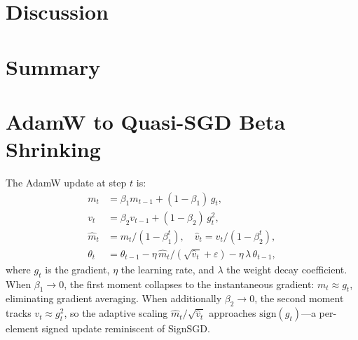\documentclass[10pt,conference,compsocconf]{IEEEtran}
\begin{document}


\section{Discussion}



\section{Summary}



\newpage




\appendix

\section{AdamW to Quasi-SGD Beta Shrinking}
\label{app:adamw-sgd}

The AdamW update at step $t$ is:
\begin{align}
  m_t &= \beta_1 m_{t-1} + (1 - \beta_1)\,g_t, \\
  v_t &= \beta_2 v_{t-1} + (1 - \beta_2)\,g_t^2, \\
  \hat{m}_t &= m_t / (1 - \beta_1^t), \quad
  \hat{v}_t = v_t / (1 - \beta_2^t), \\
  \theta_t &= \theta_{t-1} - \eta\,\hat{m}_t / (\sqrt{\hat{v}_t} + \varepsilon)
             - \eta\,\lambda\,\theta_{t-1},
\end{align}
where $g_t$ is the gradient, $\eta$ the learning rate, and $\lambda$ the weight
decay coefficient. When $\beta_1 \to 0$, the first moment collapses to the
instantaneous gradient: $m_t \approx g_t$, eliminating gradient averaging.
When additionally $\beta_2 \to 0$, the second moment tracks
$v_t \approx g_t^2$, so the adaptive scaling $\hat{m}_t/\sqrt{\hat{v}_t}$
approaches $\text{sign}(g_t)$—a per-element signed update reminiscent of
SignSGD.
\end{document}
